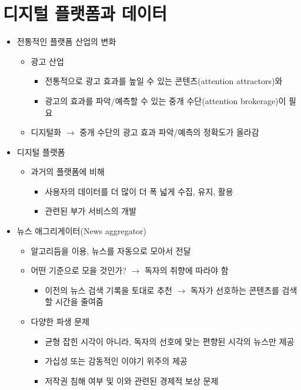 \section{디지털 플랫폼과 데이터}
\begin{itemize}
\item 전통적인 플랫폼 산업의 변화
	\begin{itemize}
	\item 광고 산업
		\begin{itemize}
		\item 전통적으로 광고 효과를 높일 수 있는 콘텐츠(attention attractors)와
		\item 광고의 효과를 파악/예측할 수 있는 중개 수단(attention brokerage)이 필요
		\end{itemize}
	\item 디지털화 $\rightarrow$ 중개 수단의 광고 효과 파악/예측의 정확도가 올라감
	\end{itemize}
\item 디지털 플랫폼
	\begin{itemize}
	\item 과거의 플랫폼에 비해
		\begin{itemize}
		\item 사용자의 데이터를 더 많이 더 폭 넓게 수집, 유지, 활용
		\item 관련된 부가 서비스의 개발
		\end{itemize}
	\end{itemize}	
\item 뉴스 애그리게이터(News aggregator)
	\begin{itemize}
	\item 알고리듬을 이용, 뉴스를 자동으로 모아서 전달
	\item 어떤 기준으로 모을 것인가? $\rightarrow$ 독자의 취향에 따라야 함
		\begin{itemize}
		\item 이전의 뉴스 검색 기록을 토대로 추천 $\rightarrow$ 독자가 선호하는 콘텐츠를 검색할 시간을 줄여줌
		\end{itemize}
	\item 다양한 파생 문제 %
		\begin{itemize}
		\item 균형 잡힌 시각이 아니라, 독자의 선호에 맞는 편향된 시각의 뉴스만 제공
		\item 가십성 또는 감동적인 이야기 위주의 제공
		\item 저작권 침해 여부 및 이와 관련된 경제적 보상 문제
		\end{itemize}
	\end{itemize}
\end{itemize}

